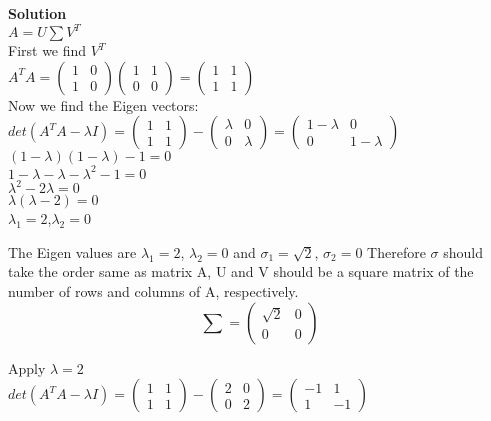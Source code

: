 \documentclass[12pt, oneside]{article}   	%
\begin{document}
\begin{enumerate}
	\textbf{Solution}\\
	
	$A=U\sum V^T$\\
	
	First we find $V^T$ \\
	
	$A^TA =\left( \begin{array}{cc} 1 & 0 \\ 1 & 0 \end{array} \right) \left( \begin{array}{cc} 1 & 1 \\ 0 & 0 \end{array} \right) =\left( \begin{array}{cc} 1 & 1 \\ 1 & 1  \end{array} \right)$\\
	
	Now we find the Eigen vectors:
	$det(A^TA- \lambda I)= \left( \begin{array}{cc} 1 & 1 \\ 1 & 1  \end{array} \right)- \left( \begin{array}{cc} \lambda & 0 \\ 0 & \lambda  \end{array} \right) =\left( \begin{array}{cc} 1-\lambda & 0 \\ 0 & 1-\lambda  \end{array} \right)$\\
	
	$(1-\lambda)(1-\lambda)-1=0$\\
	$1-\lambda-\lambda-\lambda^2-1=0$\\
	$\lambda^2 -2\lambda=0$\\
	$\lambda(\lambda -2)=0$\\
	$ \lambda_1=2$,$\lambda_2=0$
	
	
	The Eigen values are $\lambda_1=2$, $\lambda_2=0$ and  $\sigma_1=\sqrt{2}$, $\sigma_2=0$ Therefore $\sigma$ should take the order same as matrix A, U and V should be a square matrix of the number of rows and columns of A, respectively. 
	$$
	\sum =\left( \begin{array}{cc} \sqrt{2} & 0 \\ 0 & 0 \end{array} \right) 
	$$
	
	Apply $\lambda= 2$\\
	$det(A^TA- \lambda I)= \left( \begin{array}{cc} 1 & 1 \\ 1 & 1  \end{array} \right)- \left( \begin{array}{cc} 2 & 0 \\ 0 & 2  \end{array} \right) =\left( \begin{array}{cc} -1 & 1 \\ 1 & -1 \end{array} \right)$\\
	

\end{enumerate}
\end{document}
